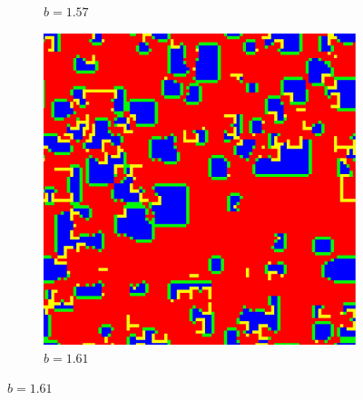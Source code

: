 \documentclass[12pt]{article}
\begin{document}
\begin{figure}[!htbp]
\begin{subfigure}{.33\textwidth}
          \caption{$b=1.57$}
          \label{fig:sub5}
        \end{subfigure}%
        \begin{subfigure}{.33\textwidth}
          \centering
          \includegraphics[width=.9\linewidth]{MeanFieldGame/snapshot_b=161.jpg}
          \caption{$b=1.61$}
          \label{fig:sub6}
        \end{subfigure}
        

\end{figure}
\end{document}
